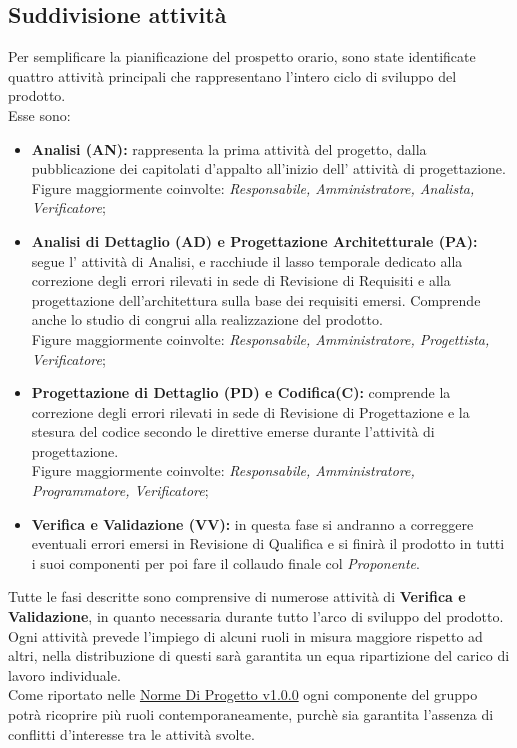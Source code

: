 \documentclass{scalatekids-article}
\begin{document}
\subsection{Suddivisione attività}
\label{sub:fasi}
Per semplificare la pianificazione del prospetto orario, sono state identificate
quattro attività principali che rappresentano l'intero ciclo di sviluppo del prodotto.\\
Esse sono:
\begin{itemize}
\item\textbf{Analisi (AN):} rappresenta la prima attività del progetto, dalla
  pubblicazione dei capitolati d'appalto all'inizio dell' attività di progettazione.\\
  Figure maggiormente coinvolte: \textit{Responsabile, Amministratore, Analista, Verificatore};
\item\textbf{Analisi di Dettaglio (AD) e Progettazione Architetturale (PA):} segue l' attività di Analisi, e
  racchiude il lasso temporale dedicato alla correzione degli errori rilevati in
  sede di Revisione di Requisiti e alla progettazione dell'architettura sulla
  base dei requisiti emersi. Comprende anche lo studio di 
  congrui alla realizzazione del prodotto.\\ Figure maggiormente coinvolte:
  \textit{Responsabile, Amministratore, Progettista, Verificatore};
\item\textbf{Progettazione di Dettaglio (PD) e Codifica(C):} comprende la correzione degli errori rilevati in sede di Revisione di Progettazione e la stesura del codice secondo le direttive emerse durante l'attività di progettazione.\\Figure maggiormente coinvolte:
  \textit{Responsabile, Amministratore, Programmatore, Verificatore};
\item\textbf{Verifica e Validazione (VV):} in questa fase si andranno a correggere eventuali errori emersi in Revisione di Qualifica e si finirà il prodotto in tutti i suoi componenti per poi fare il collaudo finale col \textit{Proponente}.
\end{itemize}
Tutte le fasi descritte sono comprensive di numerose attività di \textbf{Verifica e Validazione}, in quanto necessaria durante tutto l'arco di sviluppo del prodotto.\\Ogni attività prevede l'impiego di alcuni ruoli in misura maggiore rispetto ad altri, nella distribuzione di questi sarà garantita un equa ripartizione del
carico di lavoro individuale.\\
Come riportato nelle \href{run:../Interni/NormeDiProgetto\_v1.0.0.pdf}{Norme Di Progetto v1.0.0} ogni componente del gruppo potrà ricoprire più ruoli contemporaneamente, purchè sia garantita l'assenza di conflitti d'interesse tra le attività svolte.\\ \\
\end{document}
